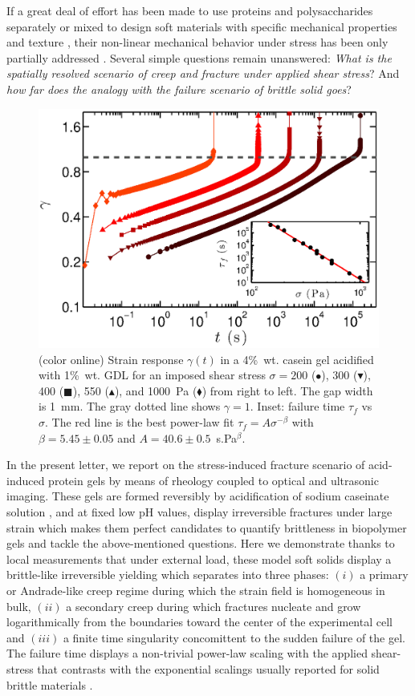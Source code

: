\documentclass[twocolumn,superscriptaddress,showpacs,preprintnumbers,amsmath,amssymb,prl]{revtex4}
\begin{document}
  If a great deal of effort has been made to use proteins and polysaccharides separately or mixed to design soft materials with specific mechanical properties and texture \cite{Dickinson:2006,Gibaud:2012}, their non-linear mechanical behavior under stress has been only partially addressed \cite{vanVliet:1995}. Several simple questions remain unanswered: {\it What is the spatially resolved scenario of creep and fracture under applied shear stress}? And {\it how far does the analogy with the failure scenario of brittle solid goes}? 
\begin{figure}
\centering
\includegraphics[width=0.9\columnwidth]{Fig1.eps}
\caption{(color online) Strain response $\gamma(t)$ in a 4\%~wt. casein gel acidified with 1\%~wt. GDL for an imposed shear stress $\sigma=200$ ($\bullet$), 300 ($\blacktriangledown$), 400 ($\blacksquare$), 550 ($\blacktriangle$), and 1000~Pa ($\blacklozenge$) from right to left. The gap width is 1~mm. The gray dotted line shows $\gamma=1$. Inset: failure time $\tau_f$ vs $\sigma$. The red line is the best power-law fit $\tau_f=A\sigma^{-\beta}$ with $\beta=5.45\pm 0.05$ and $A=40.6\pm 0.5$~s.Pa$^\beta$.
\label{fig1}}
\end{figure} 
In the present letter, we report on the stress-induced fracture scenario of acid-induced protein gels by means of rheology coupled to optical and ultrasonic imaging. These gels are formed reversibly by acidification of sodium caseinate solution \cite{Lucey:1998}, and at fixed low pH values, display irreversible fractures under large strain \cite{vanVliet:1995} which makes them perfect candidates to quantify brittleness in biopolymer gels and tackle the above-mentioned questions. 
Here we demonstrate thanks to local measurements that under external load, these model soft solids display a brittle-like irreversible yielding which separates into three phases: $(i)$ a primary or Andrade-like creep regime during which the strain field is homogeneous in bulk, $(ii)$ a secondary creep during which fractures nucleate and grow logarithmically from the boundaries toward the center of the experimental cell and $(iii)$ a finite time singularity concomittent to the sudden failure of the gel. The failure time displays a non-trivial power-law scaling with the applied shear-stress that contrasts with the exponential scalings usually reported for solid brittle materials \cite{Vanel:2009}.
\end{document}
